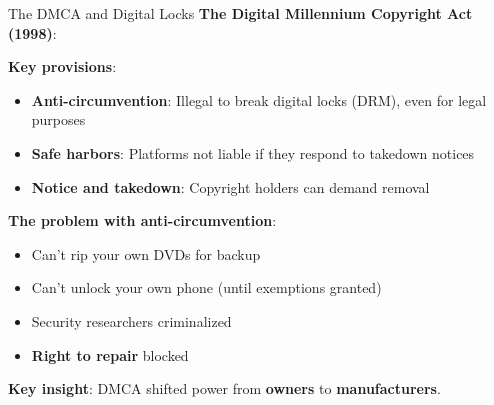 ﻿\documentclass[aspectratio=169,11pt]{beamer}
\begin{document}
\begin{frame}{The DMCA and Digital Locks}
\textbf{The Digital Millennium Copyright Act (1998)}:

\vspace{0.2cm}
\textbf{Key provisions}:
\begin{itemize}
    \item \textbf{Anti-circumvention}: Illegal to break digital locks (DRM), even for legal purposes
    \item \textbf{Safe harbors}: Platforms not liable if they respond to takedown notices
    \item \textbf{Notice and takedown}: Copyright holders can demand removal
\end{itemize}

\vspace{0.3cm}
\textbf{The problem with anti-circumvention}:
\begin{itemize}
    \item Can't rip your own DVDs for backup
    \item Can't unlock your own phone (until exemptions granted)
    \item Security researchers criminalized
    \item \textbf{Right to repair} blocked
\end{itemize}

\vspace{0.2cm}
\textbf{Key insight}: DMCA shifted power from \textbf{owners} to \textbf{manufacturers}.
\end{frame}
\end{document}
